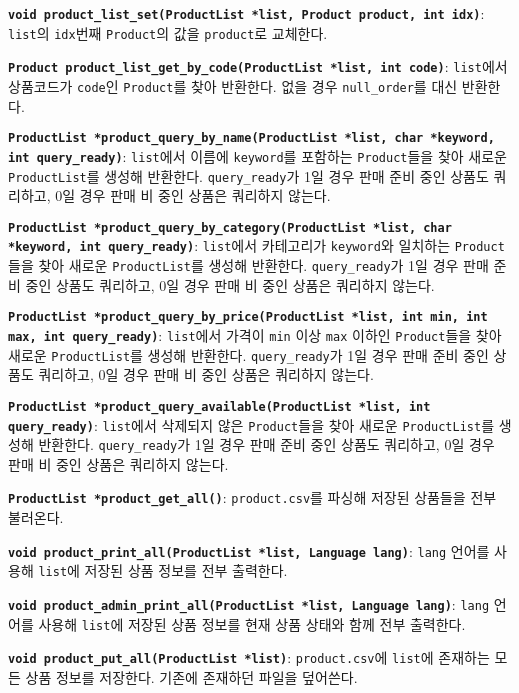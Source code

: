 \documentclass[runningheads]{llncs}
\begin{document}
\textbf{\texttt{void product_list_set(ProductList *list, Product product, int idx)}}: \texttt{list}의 \texttt{idx}번째 \texttt{Product}의 값을 \texttt{product}로 교체한다.

\textbf{\texttt{Product product_list_get_by_code(ProductList *list, int code)}}: \texttt{list}에서 상품코드가 \texttt{code}인 \texttt{Product}를 찾아 반환한다. 없을 경우 \texttt{null_order}를 대신 반환한다.

\textbf{\texttt{ProductList *product_query_by_name(ProductList *list, char *keyword, int query_ready)}}: \texttt{list}에서 이름에 \texttt{keyword}를 포함하는 \texttt{Product}들을 찾아 새로운 \texttt{ProductList}를 생성해 반환한다. \texttt{query_ready}가 1일 경우 판매 준비 중인 상품도 쿼리하고, 0일 경우 판매 비 중인 상품은 쿼리하지 않는다.

\textbf{\texttt{ProductList *product_query_by_category(ProductList *list, char *keyword, int query_ready)}}: \texttt{list}에서 카테고리가 \texttt{keyword}와 일치하는 \texttt{Product}들을 찾아 새로운 \texttt{ProductList}를 생성해 반환한다. \texttt{query_ready}가 1일 경우 판매 준비 중인 상품도 쿼리하고, 0일 경우 판매 비 중인 상품은 쿼리하지 않는다.

\textbf{\texttt{ProductList *product_query_by_price(ProductList *list, int min, int max, int query_ready)}}: \texttt{list}에서 가격이 \texttt{min} 이상 \texttt{max} 이하인 \texttt{Product}들을 찾아 새로운 \texttt{ProductList}를 생성해 반환한다. \texttt{query_ready}가 1일 경우 판매 준비 중인 상품도 쿼리하고, 0일 경우 판매 비 중인 상품은 쿼리하지 않는다.

\textbf{\texttt{ProductList *product_query_available(ProductList *list, int query_ready)}}: \texttt{list}에서 삭제되지 않은 \texttt{Product}들을 찾아 새로운 \texttt{ProductList}를 생성해 반환한다. \texttt{query_ready}가 1일 경우 판매 준비 중인 상품도 쿼리하고, 0일 경우 판매 비 중인 상품은 쿼리하지 않는다.

\textbf{\texttt{ProductList *product_get_all()}}: \texttt{product.csv}를 파싱해 저장된 상품들을 전부 불러온다.

\textbf{\texttt{void product_print_all(ProductList *list, Language lang)}}: \texttt{lang} 언어를 사용해 \texttt{list}에 저장된 상품 정보를 전부 출력한다.

\textbf{\texttt{void product_admin_print_all(ProductList *list, Language lang)}}: \texttt{lang} 언어를 사용해 \texttt{list}에 저장된 상품 정보를 현재 상품 상태와 함께 전부 출력한다.

\textbf{\texttt{void product_put_all(ProductList *list)}}: \texttt{product.csv}에 \texttt{list}에 존재하는 모든 상품 정보를 저장한다. 기존에 존재하던 파일을 덮어쓴다.
\end{document}

